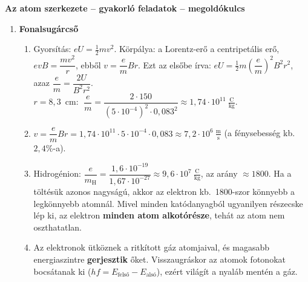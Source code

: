 \documentclass[11pt,a4paper]{article}
\begin{document}
\begin{center}
  {\Large\bfseries Az atom szerkezete -- gyakorló feladatok -- megoldókulcs}
\end{center}

\begin{enumerate}
\item \textbf{Fonalsugárcső}
  \begin{enumerate}
    \item Gyorsítás: $eU = \tfrac12 mv^2$. Körpálya: a Lorentz-erő a centripetális erő,
      $evB = \dfrac{mv^2}{r}$, ebből $v = \dfrac{e}{m}Br$. Ezt az elsőbe írva:
      $eU = \tfrac12 m\left(\dfrac{e}{m}\right)^2B^2r^2$, azaz
      $\dfrac{e}{m} = \dfrac{2U}{B^2r^2}$.\\[3pt]
      $r = 8{,}3$~cm: $\;\dfrac{e}{m} = \dfrac{2\cdot 150}{(5\cdot 10^{-4})^2\cdot 0{,}083^2}
      \approx 1{,}74\cdot 10^{11}~\tfrac{\text{C}}{\text{kg}}$.
    \item $v = \dfrac{e}{m}Br = 1{,}74\cdot 10^{11}\cdot 5\cdot 10^{-4}\cdot 0{,}083
      \approx 7{,}2\cdot 10^{6}~\tfrac{\text{m}}{\text{s}}$ (a fénysebesség kb.\ $2{,}4\%$-a).
    \item Hidrogénion: $\dfrac{e}{m_\text{H}} = \dfrac{1{,}6\cdot 10^{-19}}{1{,}67\cdot
      10^{-27}} \approx 9{,}6\cdot 10^{7}~\tfrac{\text{C}}{\text{kg}}$, az arány
      $\approx 1800$. Ha a töltésük azonos nagyságú, akkor az elektron kb.\ 1800-szor
      könnyebb a legkönnyebb atomnál. Mivel minden katódanyagból ugyanilyen részecske
      lép ki, az elektron \textbf{minden atom alkotórésze}, tehát az atom nem
      oszthatatlan.
    \item Az elektronok ütköznek a ritkított gáz atomjaival, és magasabb energiaszintre
      \textbf{gerjesztik} őket. Visszaugráskor az atomok fotonokat bocsátanak ki
      ($hf = E_\text{felső} - E_\text{alsó}$), ezért világít a nyaláb mentén a gáz.
  \end{enumerate}


\end{enumerate}
\end{document}
